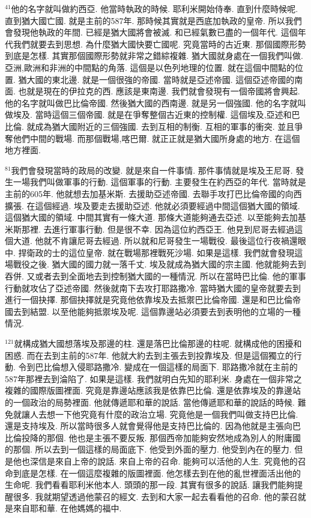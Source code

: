 \documentclass{book}
\begin{document}
$^{41}$他的名字就叫做約西亞.
他當時執政的時候.
耶利米開始侍奉.
直到什麼時候呢.
直到猶大國亡國.
就是主前的587年.
那時候其實就是西底加執政的皇帝.
所以我們會發現他執政的年間.
已經是猶大國將會被滅.
和已經氣數已盡的一個年代.
這個年代我們就要去到思想.
為什麼猶大國快要亡國呢.
究竟當時的古近東.
那個國際形勢到底是怎樣.
其實那個國際形勢就非常之錯綜複雜.
猶大國就身處在一個我們叫做.
亞洲,歐洲和非洲的中間點的角落.
這個是以色列地理的位置.
就在這個中間點的位置.
猶大國的東北邊.
就是一個很強的帝國.
當時就是亞述帝國.
這個亞述帝國的南面.
也就是現在的伊拉克的西.
應該是東南邊.
我們就會發現有一個帝國將會興起.
他的名字就叫做巴比倫帝國.
然後猶大國的西南邊.
就是另一個強國.
他的名字就叫做埃及.
當時這個三個帝國.
就是在爭奪整個古近東的控制權.
這個埃及,亞述和巴比倫.
就成為猶大國附近的三個強國.
去到互相的制衡.
互相的軍事的衝突.
並且爭奪他們中間的戰場.
而那個戰場,喀巴爾.
就正正就是猶大國所身處的地方.
在這個地方裡面.

$^{81}$我們會發現當時的政局的改變.
就是來自一件事情.
那件事情就是埃及王尼哥.
發生一場我們叫做軍事的行動.
這個軍事的行動.
主要發生在約西亞的年代.
當時就是主前的605年.
他就想去加基米斯.
去援助亞述帝國.
去聯手攻打巴比倫帝國的向西擴張.
在這個經過.
埃及要走去援助亞述.
他就必須要經過中間這個猶大國的領域.
這個猶大國的領域.
中間其實有一條大道.
那條大道能夠通去亞述.
以至能夠去加基米斯那裡.
去進行軍事行動.
但是很不幸.
因為這位約西亞王.
他見到尼哥去經過這個大道.
他就不肯讓尼哥去經過.
所以就和尼哥發生一場戰役.
最後這位行夜禍還眼中.
捍衛政的士的這位皇帝.
就在戰場那裡戰死沙場.
如果是這樣.
我們就會發現這場戰役之後.
猶大國的國力就一落千丈.
埃及就成為猶大國的宗主國.
他就能夠去到吞併.
又或者去到全面地去到控制猶大國的一種情況.
所以在當時巴比倫.
他的軍事行動就攻佔了亞述帝國.
然後就南下去攻打耶路撒冷.
當時猶大國的皇帝就要去到進行一個抉擇.
那個抉擇就是究竟他依靠埃及去抵禦巴比倫帝國.
還是和巴比倫帝國去到結盟.
以至他能夠抵禦埃及呢.
這個靠邊站必須要去到表明他的立場的一種情況.

$^{121}$就構成猶大國想落埃及那邊的柱.
還是落巴比倫那邊的柱呢.
就構成他的困擾和困惑.
而在去到主前的587年.
他就大約去到主張去到投靠埃及.
但是這個獨立的行動.
令到巴比倫想入侵耶路撒冷.
變成在一個這樣的局面下.
耶路撒冷就在主前的587年那裡去到淪陷了.
如果是這樣.
我們就明白先知的耶利米.
身處在一個非常之複雜的國際版圖裡面.
究竟是靠邊站應該我是依靠巴比倫.
還是依靠埃及的靠邊站的一個政治的局勢裡面.
他就傳遞耶和華的說話.
當他傳遞耶和華的說話的時候.
難免就讓人去想一下他究竟有什麼的政治立場.
究竟他是一個我們叫做支持巴比倫.
還是支持埃及.
所以當時很多人就會覺得他是支持巴比倫的.
因為他就是主張向巴比倫投降的那個.
他也是主張不要反叛.
那個西帝加能夠安然地成為別人的附庸國的那個.
所以去到一個這樣的局面底下.
他受到外面的壓力.
他受到內在的壓力.
但是他也深信是來自上帝的說話.
來自上帝的召命.
能夠可以活他的人生.
究竟他的召命到底是怎樣.
在一個這麼複雜的版圖裡面.
他怎樣去到在他的亂世裡面活出他的生命呢.
我們看看耶利米他本人.
頭頭的那一段.
其實有很多的說話.
讓我們能夠提醒很多.
我就期望透過他蒙召的經文.
去到和大家一起去看看他的召命.
他的蒙召就是來自耶和華.
在他媽媽的福中.
\end{document}
